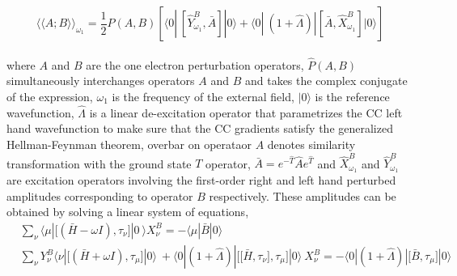 %
\begin{equation}
{\langle\langle A;B\rangle\rangle}_{\omega_1} =  \frac{1}{2}\hat{P}(A,B)[\langle 0 | \
[\hat{Y}^{B}_{\omega_1}, \bar{A}]|0\rangle + \langle 0 | \
(1 + \hat{\Lambda})|[\bar{A},\hat{X}^{B}_{\omega_1}]|0\rangle]
\end{equation}
\\
where $A$ and $B$ are the one electron perturbation operators,
$\hat{P}(A,B)$ simultaneously interchanges operators $A$ and $B$
and takes the complex conjugate of the expression,
$\omega_1$ is the frequency of the external field, 
$|0\rangle$ is the reference wavefunction, $\hat{\Lambda}$ is 
a linear de-excitation operator that parametrizes the CC left hand 
wavefunction to make sure that the CC gradients satisfy the 
generalized Hellman-Feynman theorem\cite{},
overbar on operataor $A$ denotes similarity transformation with the ground state
$T$ operator, $\bar{A} = e^{-\hat{T}}\hat{A}e^{\hat{T}}$
and $\hat{X}^{B}_{\omega_1}$ and $\hat{Y}^{B}_{\omega_1}$ are excitation operators involving 
the first-order right and left hand perturbed amplitudes corresponding to operator 
$B$ respectively. These amplitudes can be obtained by solving a linear system
of equations,
\begin{equation}
\begin{split}
&\sum_\nu\langle \mu | \big[(\bar{H} - \omega I),\tau_\nu\big] |0 \
\rangle X_{\nu}^{B} = -\langle \mu|\bar{B}|0 \rangle \\
&\sum_\nu Y_{\nu}^{B}\langle \nu | \big[(\bar{H} + \omega I),\tau_\mu\big] |0 \rangle \
+ \langle 0|(1 + \hat{\Lambda})|\big[\big[\bar{H},\tau_\nu\big],\tau_\mu\big] |0 \rangle\  X_{\nu}^{B}
= -\langle 0|(1 + \hat{\Lambda})|\big[\bar{B},\tau_\mu\big] |0 \rangle \\
\end{split}
\end{equation}

